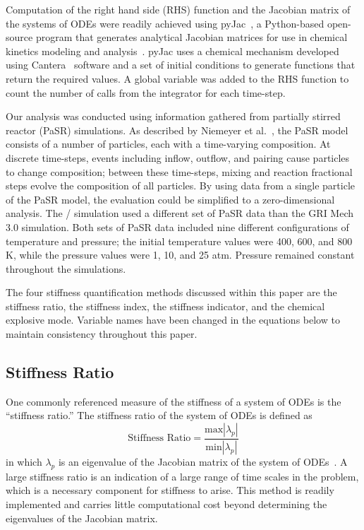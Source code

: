 \documentclass[12pt]{ussci}
\begin{document}
Computation of the right hand side (RHS) function and the Jacobian matrix of the systems of ODEs were readily achieved using pyJac~\cite{pyJac:1.0.2}, a Python-based open-source program that generates analytical Jacobian matrices for use in chemical kinetics modeling and analysis~\cite{Niemeyer:2017}.
pyJac uses a chemical mechanism developed using Cantera~\cite{Goodwin:2015aa} software and a set of initial conditions to generate functions that return the required values.  A global variable was added to the RHS function to count the number of calls from the integrator for each time-step.

Our analysis was conducted using information gathered from partially stirred reactor (PaSR) simulations.
As described by Niemeyer et al.~\cite{Niemeyer:2017}, the PaSR model consists of a number of particles, each with a time-varying composition.
At discrete time-steps, events including inflow, outflow, and pairing cause particles to change composition; between these time-steps, mixing and reaction fractional steps evolve the composition of all particles.
By using data from a single particle of the PaSR model, the evaluation could be simplified to a zero-dimensional analysis.
The \slash {} simulation used a different set of PaSR data than the GRI Mech 3.0 simulation.
Both sets of PaSR data included nine different configurations of temperature and pressure; the initial temperature values were 400, 600, and 800 K, while the pressure values were 1, 10, and 25 atm.
Pressure remained constant throughout the simulations.



The four stiffness quantification methods discussed within this paper are the stiffness ratio, the stiffness index, the stiffness indicator, and the chemical explosive mode.
Variable names have been changed in the equations below to maintain consistency throughout this paper.

\subsection{Stiffness Ratio}
One commonly referenced measure of the stiffness of a system of ODEs is the ``stiffness ratio.''
The stiffness ratio of the system of ODEs is defined as
\begin{equation}
	\textrm{Stiffness Ratio} = \frac{\textrm{max}|\lambda_p|}{\textrm{min}|\lambda_p|}
\end{equation}	
in which $\lambda_p$ is an eigenvalue of the Jacobian matrix of the system of ODEs~\cite{LeVeque2007}.
A large stiffness ratio is an indication of a large range of time scales in the problem, which is a necessary component for stiffness to arise.
This method is readily implemented and carries little computational cost beyond determining the eigenvalues of the Jacobian matrix.
\end{document}
